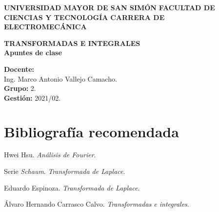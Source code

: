 \documentclass[letter,oneside,11pt]{book}
\begin{document}
\begin{titlepage}
    \begin{center}
        \begin{minipage}[]{.55\linewidth}
            \centering
            \large{\textbf{UNIVERSIDAD MAYOR DE SAN SIMÓN}} \newline
            \large{\textbf{FACULTAD DE CIENCIAS Y TECNOLOGÍA}} \newline
            \large{\textbf{CARRERA DE ELECTROMECÁNICA}} \newline
        \end{minipage}

        \vspace*{7.0cm}
        {\Large \textbf{TRANSFORMADAS E INTEGRALES}}\\
        \vspace*{0.3cm}
        {\Large \textbf{Apuntes de clase}}\\
    \end{center}

    \vspace*{8.0cm}
    \leftskip=7.95cm
    \noindent
    \textbf{Docente:}\\
    Ing. Marco Antonio Vallejo Camacho.\\
    \newline
    \textbf{Grupo:} 2.\\
    \textbf{Gestión:} 2021/02.\\
\end{titlepage}

\clearpage
\setcounter{page}{1}

\tableofcontents
\newpage

\section*{Bibliografía recomendada}
\begin{enumerate}[{label=[\arabic{*}]}]
\item Hwei Hsu. \emph{Análisis de Fourier}.
\item Serie \emph{Schaum}. \emph{Transformada de Laplace}.
\item Eduardo Espinoza. \emph{Transformada de Laplace}.
\item Álvaro Hernando Carrasco Calvo. \emph{Transformadas e integrales}.
\end{enumerate}


%
%
%
%
%
%
\end{document}
